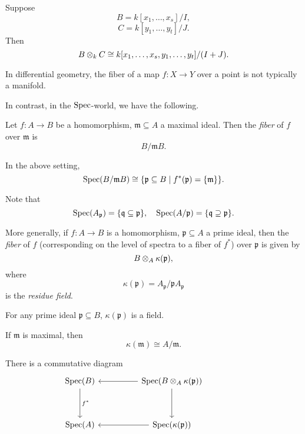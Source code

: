\begin{corollary}
  Suppose
  \[ B = k[x_1, \dotsc, x_s] / {I},\]
  \[ C = k[y_1, \dotsc, y_t] /{J}.\]
  Then
  \[ B \otimes_k C \cong k[x_1, \dotsc, x_s, y_1, \dotsc, y_t] / {(I + J)}.\]
\end{corollary}

In differential geometry, the fiber of a map $f \colon X \to Y$ over a point is not typically a manifold.

In contrast, in the $\text{Spec}$-world, we have the following.

\begin{df}
  Let $f \colon A \to B$ be a homomorphism, $\mathfrak m \subseteq A$ a maximal ideal. Then the \textit{fiber} of $f$ over $\mathfrak m$ is
  \[ B /{\mathfrak m B}.\]
\end{df}

\begin{prop}
  In the above setting,
  \[\text{Spec}(B /{\mathfrak m B}) \cong \{ \mathfrak p \subseteq B \mathrel{|} f^*(\mathfrak p) = \{ \mathfrak m \} \}.\]
\end{prop}

Note that
\[ \text{Spec}(A_{\mathfrak p}) = \{ \mathfrak q \subseteq \mathfrak p\}, \quad
\text{Spec}(A /{\mathfrak p}) = \{ \mathfrak q \supseteq \mathfrak p\}.\]

\begin{df}
  More generally, if $f \colon A \to B$ is a homomorphism, $\mathfrak p \subseteq A$ a prime ideal, then the \textit{fiber} of $f$ (corresponding on the level of spectra to a fiber of \(f^*\)) over $\mathfrak p$ is given by
  \[ B \otimes_A \kappa(\mathfrak p),\]
  where
  \[ \kappa(\mathfrak p) = A_{\mathfrak p} / {\mathfrak p A_{\mathfrak p}}\]
  is the \textit{residue field}.
\end{df}

\begin{prop}
  For any prime ideal $\mathfrak p \subseteq B$, $\kappa(\mathfrak p)$ is a field.
\end{prop}

\begin{note}
  If $\mathfrak m$ is maximal, then
  \[ \kappa(\mathfrak m) \cong A / {\mathfrak m}.\]
\end{note}

\begin{prop}
  There is a commutative diagram
  \begin{equation*}
    \begin{tikzcd}[row sep = huge, column sep = huge]
      \spec(B) \arrow{d}{f^*}
      & \spec(B \tensor_A \kappa(\mathfrak p)) \arrow{l} \arrow{d} \\
      \spec(A) &
      \spec(\kappa(\mathfrak p)) \arrow{l}
      &
    \end{tikzcd}
  \end{equation*}
\end{prop}




